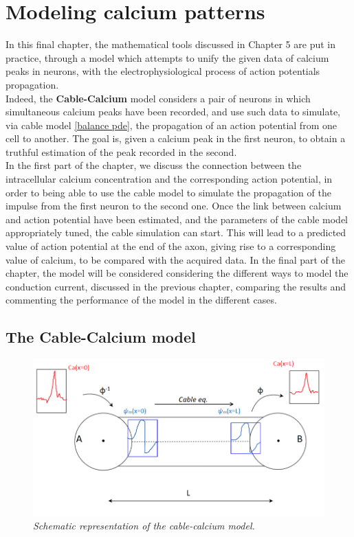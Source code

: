 \documentclass[12pt, a4paper]{report}
\begin{document}
\chapter{Modeling calcium patterns}

In this final chapter, the mathematical tools discussed in Chapter 5 are put in practice, through a model which attempts to unify the given data of calcium peaks in neurons, with the electrophysiological process of action potentials propagation.\\
Indeed, the \textbf{Cable-Calcium} model considers a pair of neurons in which simultaneous calcium peaks have been recorded, and use such data to simulate, via cable model \ref{balance pde}, the propagation of an action potential from one cell to another. The goal is, given a calcium peak in the first neuron, to obtain a truthful estimation of the peak recorded in the second.\\ 
In the first part of the chapter, we discuss the connection between the intracellular calcium concentration and the corresponding action potential, in order to being able to use the cable model to simulate the propagation of the impulse from the first neuron to the second one. Once the link between calcium and action potential have been estimated, and the parameters of the cable model appropriately tuned, the cable simulation can start. This will lead to a predicted value of action potential at the end of the axon, giving rise to a corresponding value of calcium, to be compared with the acquired data. In the final part of the chapter, the model will be considered considering the different ways to model the conduction current, discussed in the previous chapter, comparing the results and commenting the performance of the model in the different cases.




\section{The Cable-Calcium model}

\begin{figure}[H]
	\begin{center}
		
		\includegraphics[scale=0.65]{cable_ca.png} 
	\end{center} 
	\caption{\textit{Schematic representation of the cable-calcium model.}}
	\label{cabel_ca}
\end{figure}
\end{document}

